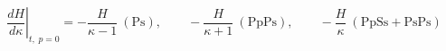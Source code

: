 $$
\left.\frac{dH}{d\kappa}\right|_{t,\;p=0} = - \frac{H}{\kappa - 1}\ (\mathrm{Ps}),\qquad - \frac{H}{\kappa + 1}\ (\mathrm{PpPs}),\qquad - \frac{H}{\kappa}\ (\mathrm{PpSs{+}PsPs})
\label{eq:tradeoff}
$$
